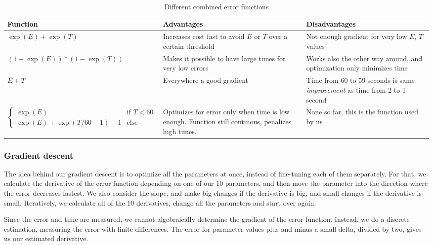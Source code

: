 \documentclass[10pt,conference,compsocconf]{IEEEtran}
\begin{document}
\begin{table}
  \centering
  \begin{tabular}{|l|p{5cm}|p{5cm}|}
    \hline
    Function&Advantages&Disadvantages\\
    \hline
    $\exp(E)+\exp(T)$ & Increases cost fast to avoid $E$ or $T$ over a certain threshold & Not enough gradient for very low $E$, $T$ values\\
    \hline
    $(1-\exp(E))*(1-\exp(T))$ & Makes it possible to have large times for very low errors & Works also the other way around, and optimization only minimizes time\\
    \hline
    $E + T$ & Everywhere a good gradient & Time from 60 to 59 seconds is same \textit{improvement} as time from 2 to 1 second\\
    \hline
    $\begin{cases}
  \exp(E)  & \text{if }T<60\\
  \exp(E)+\exp(T/60 - 1) - 1 & \text{else}
\end{cases}$ & Optimizes for error only when time is low enough. Function still continous, penalizes high times. & None so far, this is the function used by us\\
    \hline
  \end{tabular}
  \caption{Different combined error functions}
  \label{error_function_table}
\end{table}


\subsubsection{Gradient descent}
The idea behind our gradient descent is to optimize all the parameters at once, instead of fine-tuning each of them separately. For that, we
calculate the derivative of the error function depending on one of our 10 parameters, and then move the parameter into the direction where the
error decreases fastest. We also consider the slope, and make big changes if the derivative is big, and small changes if the derivative is small.
Iteratively, we calculate all of the 10 derivatives, change all the parameters and start over again.

Since the error and time are measured, we cannot algebraically determine the gradient of the error function. Instead, we do a discrete estimation,
measuring the error with finite differences. The error for parameter values plus and minus a small delta, divided by two, gives us our estimated
derivative.
\end{document}
